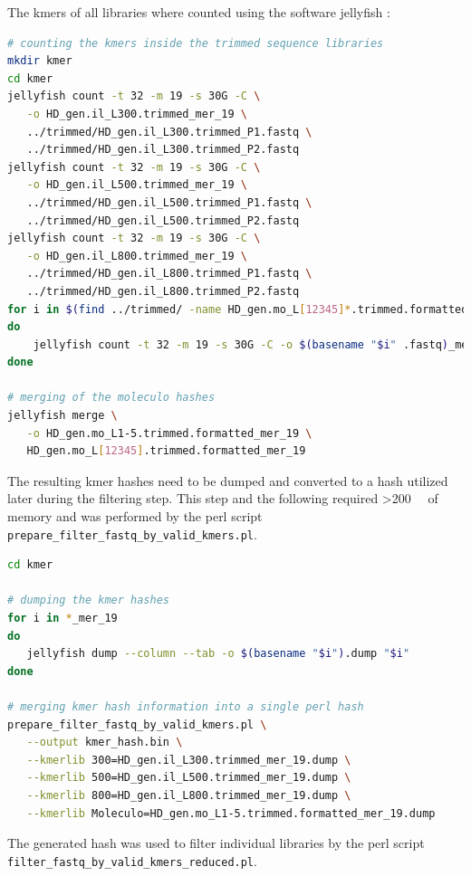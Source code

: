 \documentclass[12pt,a4paper]{scrartcl}
\begin{document}
The kmers of all libraries where counted using the software jellyfish \parencite{Marcais2011}:

\begin{lstlisting}[language=bash]
# counting the kmers inside the trimmed sequence libraries
mkdir kmer
cd kmer
jellyfish count -t 32 -m 19 -s 30G -C \
   -o HD_gen.il_L300.trimmed_mer_19 \
   ../trimmed/HD_gen.il_L300.trimmed_P1.fastq \
   ../trimmed/HD_gen.il_L300.trimmed_P2.fastq
jellyfish count -t 32 -m 19 -s 30G -C \
   -o HD_gen.il_L500.trimmed_mer_19 \
   ../trimmed/HD_gen.il_L500.trimmed_P1.fastq \
   ../trimmed/HD_gen.il_L500.trimmed_P2.fastq
jellyfish count -t 32 -m 19 -s 30G -C \
   -o HD_gen.il_L800.trimmed_mer_19 \
   ../trimmed/HD_gen.il_L800.trimmed_P1.fastq \
   ../trimmed/HD_gen.il_L800.trimmed_P2.fastq
for i in $(find ../trimmed/ -name HD_gen.mo_L[12345]*.trimmed.formatted.fastq)
do
    jellyfish count -t 32 -m 19 -s 30G -C -o $(basename "$i" .fastq)_mer_19 "$i"
done

# merging of the moleculo hashes
jellyfish merge \
   -o HD_gen.mo_L1-5.trimmed.formatted_mer_19 \
   HD_gen.mo_L[12345].trimmed.formatted_mer_19
\end{lstlisting}

The resulting kmer hashes need to be dumped and converted to a hash
utilized later during the filtering step. This step and the following
required \SI{>200}{\giga\byte} of memory and was performed by the perl
script \texttt{prepare\_filter\_fastq\_by\_valid\_kmers.pl}.

\begin{lstlisting}[language=bash]
cd kmer

# dumping the kmer hashes
for i in *_mer_19
do
   jellyfish dump --column --tab -o $(basename "$i").dump "$i"
done

# merging kmer hash information into a single perl hash
prepare_filter_fastq_by_valid_kmers.pl \
   --output kmer_hash.bin \
   --kmerlib 300=HD_gen.il_L300.trimmed_mer_19.dump \
   --kmerlib 500=HD_gen.il_L500.trimmed_mer_19.dump \
   --kmerlib 800=HD_gen.il_L800.trimmed_mer_19.dump \
   --kmerlib Moleculo=HD_gen.mo_L1-5.trimmed.formatted_mer_19.dump
\end{lstlisting}

The generated hash was used to filter individual libraries by the perl
script \texttt{filter\_fastq\_by\_valid\_kmers\_reduced.pl}.
\end{document}
